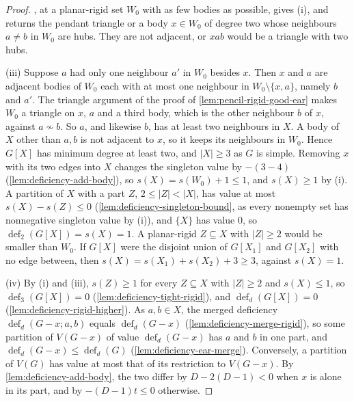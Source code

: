 \begin{proof}
  \leanok
  , at a planar-rigid set $W_0$ with as
  few bodies as possible, gives (i), and returns the pendant triangle or a
  body $x \in W_0$ of degree two whose neighbours $a \ne b$ in $W_0$ are
  hubs. They are not adjacent, or $x a b$ would be a
  triangle with two hubs.

  (iii) Suppose $a$ had only one neighbour $a'$ in $W_0$ besides $x$.
  Then $x$ and $a$ are adjacent bodies of $W_0$ each with at most one
  neighbour in $W_0 \setminus \{x, a\}$, namely $b$ and $a'$. The triangle
  argument of the proof of \cref{lem:pencil-rigid-good-ear} makes $W_0$ a
  triangle on $x$, $a$ and a third body, which is the other neighbour $b$
  of $x$, against $a \not\sim b$. So $a$, and likewise
  $b$, has at least two neighbours in $X$. A body of $X$ other than $a, b$
  is not adjacent to $x$, so it keeps its neighbours in $W_0$. Hence
  $G[X]$ has minimum degree at least two, and $|X| \ge 3$ as $G$ is
  simple. Removing $x$ with its two edges into $X$ changes the singleton
  value by $-(3 - 4)$ (\cref{lem:deficiency-add-body}), so
  $s(X) = s(W_0) + 1 \le 1$, and $s(X) \ge 1$ by (i). A partition of $X$
  with a part $Z$, $2 \le |Z| < |X|$, has value at most
  $s(X) - s(Z) \le 0$ (\cref{lem:deficiency-singleton-bound}, as every
  nonempty set has nonnegative singleton value by (i)), and $\{X\}$ has
  value $0$, so $\operatorname{def}_2(G[X]) = s(X) = 1$. A planar-rigid
  $Z \subseteq X$ with $|Z| \ge 2$ would be smaller than $W_0$. If $G[X]$
  were the disjoint union of $G[X_1]$ and $G[X_2]$ with no edge between,
  then $s(X) = s(X_1) + s(X_2) + 3 \ge 3$, against $s(X) = 1$.

  (iv) By (i) and (iii), $s(Z) \ge 1$ for every $Z \subseteq X$ with
  $|Z| \ge 2$ and $s(X) \le 1$, so $\operatorname{def}_3(G[X]) = 0$
  (\cref{lem:deficiency-tight-rigid}), and $\operatorname{def}_d(G[X]) =
  0$ (\cref{lem:deficiency-rigid-higher}). As $a, b \in X$, the merged
  deficiency $\operatorname{def}_d(G - x; a, b)$ equals
  $\operatorname{def}_d(G - x)$ (\cref{lem:deficiency-merge-rigid}), so
  some partition of $V(G - x)$ of value $\operatorname{def}_d(G - x)$ has
  $a$ and $b$ in one part, and $\operatorname{def}_d(G - x) \le
  \operatorname{def}_d(G)$ (\cref{lem:deficiency-ear-merge}). Conversely,
  a partition of $V(G)$ has value at most that of its restriction to
  $V(G - x)$. By \cref{lem:deficiency-add-body}, the two differ by
  $D - 2(D - 1) < 0$ when $x$ is alone in its part, and by
  $-(D - 1)t \le 0$ otherwise.


\end{proof}
